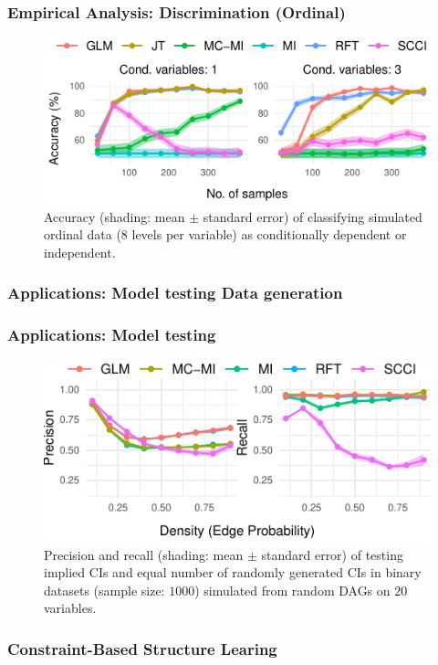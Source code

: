 \documentclass{beamer}
\begin{document}
\begin{frame}
	\frametitle{Empirical Analysis: Discrimination (Ordinal)}
	\begin{figure}
		\centering
		\includegraphics{imgs/accuracy_ordinal.pdf}
		\caption*{Accuracy (shading: mean $\pm$ standard error) of
		classifying simulated ordinal data (8 levels per variable) as
		conditionally dependent or independent.}	
	\end{figure}
\end{frame}

\begin{frame}
	\frametitle{Applications: Model testing Data generation}
\end{frame}

\begin{frame}
	\frametitle{Applications: Model testing}
	\begin{figure}
		\centering
		\includegraphics{imgs/model_testing.pdf}
		\caption*{Precision and recall (shading: mean $\pm$ standard
		error) of testing implied CIs and equal number of randomly
		generated CIs in binary datasets (sample size: $1000$)
		simulated from random DAGs on $ 20 $ variables.}
	\end{figure}
\end{frame}

\begin{frame}
	\frametitle{Constraint-Based Structure Learing}
\end{frame}
\end{document}
